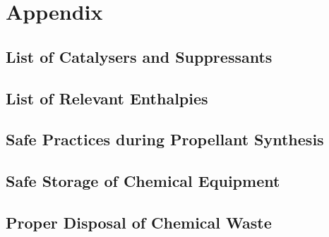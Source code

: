 \documentclass[12pt,letterpaper]{article}
\begin{document}
    \section{Appendix}
    \subsection{List of Catalysers and Suppressants}
                \lipsum[1-2]
        \subsection{List of Relevant Enthalpies}
                \lipsum[1-2]
        \subsection{Safe Practices during Propellant Synthesis}
                \lipsum[1-3]
        \subsection{Safe Storage of Chemical Equipment}
                \lipsum[1-2]
    \subsection{Proper Disposal of Chemical Waste}
                \lipsum[1-2]

    \printbibliography
\end{document}
